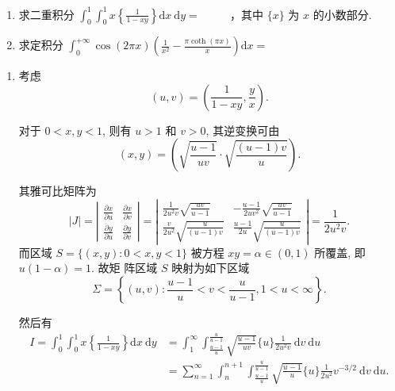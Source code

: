 \begin{solution}
    \begin{enumerate}
        \item 求二重积分 $\int_0^1 \int_0^1 x\left\{\frac{1}{1-x y}\right\} \mathrm{d} x \mathrm{~d} y=$ $\qquad$ ，其中 $\{x\}$ 为 $x$ 的小数部分.
        \item 求定积分 $\int_0^{+\infty} \cos (2 \pi x)\left(\frac{1}{x^2}-\frac{\pi \operatorname{coth}(\pi x)}{x}\right) \mathrm{d} x=$ $\qquad$
    \end{enumerate}

    \begin{enumerate}
        \item 考虑
              $$
                  (u, v)=\left(\frac{1}{1-x y}, \frac{y}{x}\right) .
              $$

              对于 $0<x, y<1$, 则有 $u>1$ 和 $v>0$, 其逆变换可由
              $$
                  (x, y)=\left(\sqrt{\frac{u-1}{u v}} \cdot \sqrt{\frac{(u-1) v}{u}}\right) .
              $$

              其雅可比矩阵为
              $$
                  |J|=\left|\begin{array}{ll}
                      \frac{\partial x}{\partial u} & \frac{\partial x}{\partial v} \\
                      \frac{\partial y}{\partial u} & \frac{\partial y}{\partial v}
                  \end{array}\right|=\left|\begin{array}{cc}
                      \frac{1}{2 u^2 v} \sqrt{\frac{u v}{u-1}} & -\frac{u-1}{2 u v^2} \sqrt{\frac{u v}{u-1}} \\
                      \frac{v}{2 u^2} \sqrt{\frac{u}{(u-1) v}} & \frac{u-1}{2 u} \sqrt{\frac{u}{(u-1) v}}
                  \end{array}\right|=\frac{1}{2 u^2 v} .
              $$
              而区域 $S=\{(x, y): 0<x, y<1\}$ 被方程 $x y=\alpha \in(0,1)$ 所覆盖, 即 $u(1-\alpha)=1$. 故矩
              阵区域 $S$ 映射为如下区域
              $$
                  \Sigma=\left\{(u, v): \frac{u-1}{u}<v<\frac{u}{u-1}, 1<u<\infty\right\} .
              $$

              然后有
              $$
                  \begin{aligned}
                      I=\int_0^1 \int_0^1 x\left\{\frac{1}{1-x y}\right\} \mathrm{d} x \mathrm{~d} y & =\int_1^{\infty} \int_{\frac{u-1}{u}}^{\frac{u}{u-1}} \sqrt{\frac{u-1}{u v}}\{u\} \frac{1}{2 u^2 v} \mathrm{~d} v \mathrm{~d} u                           \\
                                                                                                     & =\sum_{n=1}^{\infty} \int_n^{n+1} \int_{\frac{u-1}{u}}^{\frac{u}{u-1}} \sqrt{\frac{u-1}{u}}\{u\} \frac{1}{2 u^2} v^{-3 / 2} \mathrm{~d} v \mathrm{~d} u .
                  \end{aligned}
              $$


\end{enumerate}
\end{solution}
